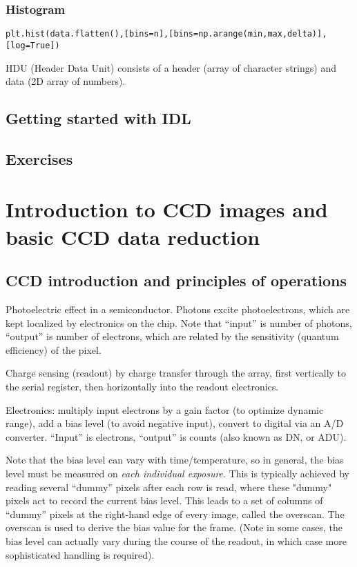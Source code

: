 \documentclass{article}
\begin{document}
\subsubsection*{Histogram}
\begin{itemize*}
    \item \verb|plt.hist(data.flatten(),[bins=n],[bins=np.arange(min,max,delta)],[log=True])|
\end{itemize*}

HDU (Header Data Unit) consists of a header (array of character strings) and
data (2D array of numbers).

\subsection*{Getting started with IDL}
\subsection*{Exercises}

\section*{Introduction to CCD images and basic CCD data reduction}
\subsection*{CCD introduction and principles of operations}
Photoelectric effect in a semiconductor. Photons excite
photoelectrons, which are kept localized by electronics on the chip.
Note that ``input'' is number of photons, ``output'' is number of
electrons, which are related by the sensitivity (quantum efficiency)
of the pixel.

Charge sensing (readout) by charge transfer through the array, first
vertically to the serial register, then horizontally into the readout
electronics.

Electronics: multiply input electrons by a gain factor (to optimize
dynamic range), add a bias level (to avoid negative input), convert to
digital via an A/D converter. ``Input'' is electrons, ``output'' is counts
(also known as DN, or ADU).

Note that the bias level can vary with time/temperature, so in
general, the bias level must be measured on \emph{each individual exposure}.
This is typically achieved by reading several ``dummy'' pixels after
each row is read, where these "dummy" pixels act to record the current
bias level. This leads to a set of columns of ``dummy'' pixels at the
right-hand edge of every image, called the overscan. The overscan is
used to derive the bias value for the frame. (Note in some cases, the
bias level can actually vary during the course of the readout, in
which case more sophisticated handling is required).
\end{document}
